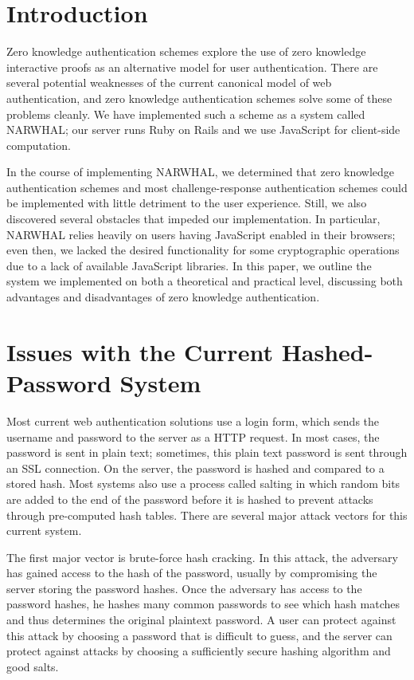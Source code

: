\documentclass[11pt]{article}
\begin{document}
\section{Introduction}

Zero knowledge authentication schemes explore the use of zero knowledge interactive proofs as an alternative model for user authentication.  There are several potential weaknesses of the current canonical model of web authentication, and zero knowledge authentication schemes solve some of these problems cleanly.  We have implemented such a scheme as a system called NARWHAL; our server runs Ruby on Rails and we use JavaScript for client-side computation.

In the course of implementing NARWHAL, we determined that zero knowledge authentication schemes and  most challenge-response authentication schemes could be implemented with little detriment to the user experience.  Still, we also discovered several obstacles that impeded our implementation.  In particular, NARWHAL relies heavily on users having JavaScript enabled in their browsers; even then, we lacked the desired functionality for some cryptographic operations due to a lack of available JavaScript libraries.  In this paper, we outline the system we implemented on both a theoretical and practical level, discussing both advantages and disadvantages of zero knowledge authentication.


\section{Issues with the Current Hashed-Password System}

Most current web authentication solutions use a login form, which sends the username and password to the server as a HTTP request.  In most cases, the password is sent in plain text; sometimes, this plain text password is sent through an SSL connection.  On the server, the password is hashed and compared to a stored hash.  Most systems also use a process called salting in which random bits are added to the end of the password before it is hashed to prevent attacks through pre-computed hash tables\cite{Zhou}.  There are several major attack vectors for this current system.

The first major vector is brute-force hash cracking\cite{Lum}.  In this attack, the adversary has gained access to the hash of the password, usually by compromising the server storing the password hashes.  Once the adversary has access to the password hashes, he hashes many common passwords to see which hash matches and thus determines the original plaintext password.  A user can protect against this attack by choosing a password that is difficult to guess, and the server can protect against attacks by choosing a sufficiently secure hashing algorithm and good salts.
\end{document}
